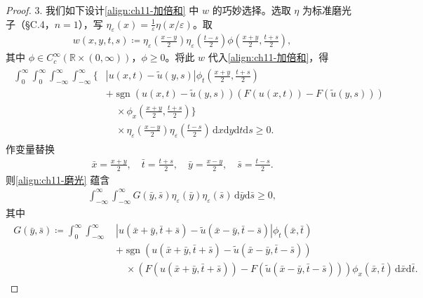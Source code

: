 \documentclass[../../main.tex]{subfiles}
\begin{document}
\begin{proof}
3. 我们如下设计\eqref{align:ch11-加倍和} 中 $w$ 的巧妙选择。选取 $\eta$ 为标准磨光子（\S C.4，$n=1$），写 $\eta_\varepsilon(x)=\frac{1}{\varepsilon}\eta(x/\varepsilon)$。取
\begin{align*}
w(x,y,t,s)\coloneqq\eta_\varepsilon\left(\frac{x-y}{2}\right)\eta_\varepsilon\left(\frac{t-s}{2}\right)\phi\left(\frac{x+y}{2},\frac{t+s}{2}\right),
\end{align*}
其中 $\phi\in C_c^\infty(\mathbb{R}\times(0,\infty))$，$\phi\geqslant 0$。将此 $w$ 代入\eqref{align:ch11-加倍和}，得
{\footnotesize\begin{align}
\begin{split}
\int_0^\infty\int_0^\infty\int_{-\infty}^\infty\int_{-\infty}^\infty \bigg\{&|u(x,t)-\widetilde{u}(y,s)|\phi_t\left(\frac{x+y}{2},\frac{t+s}{2}\right)\\
&+\operatorname{sgn}(u(x,t)-\widetilde{u}(y,s))(F(u(x,t))-F(\widetilde{u}(y,s)))\\
&\quad\times\phi_x\left(\frac{x+y}{2},\frac{t+s}{2}\right)\bigg\}\\
&\quad\times\eta_\varepsilon\left(\frac{x-y}{2}\right)\eta_\varepsilon\left(\frac{t-s}{2}\right)\,\mathrm{d}x\mathrm{d}y\mathrm{d}t\mathrm{d}s\geqslant 0.
\end{split}
\label{align:ch11-磨光}
\end{align}}
作变量替换
\begin{align*}
\bar{x}=\frac{x+y}{2},\quad \bar{t}=\frac{t+s}{2},\quad \bar{y}=\frac{x-y}{2},\quad \bar{s}=\frac{t-s}{2}.
\end{align*}
则\eqref{align:ch11-磨光} 蕴含
\begin{align*}
\int_{-\infty}^\infty\int_{-\infty}^\infty G(\bar{y},\bar{s})\eta_\varepsilon(\bar{y})\eta_\varepsilon(\bar{s})\,\mathrm{d}\bar{y}\mathrm{d}\bar{s}\geqslant 0,
\end{align*}
其中
\begin{align*}
\begin{aligned}
G(\bar{y},\bar{s})\coloneqq\int_0^\infty\int_{-\infty}^\infty \,&|u(\bar{x}+\bar{y},\bar{t}+\bar{s})-\widetilde{u}(\bar{x}-\bar{y},\bar{t}-\bar{s})|\phi_t(\bar{x},\bar{t})\\
&+\operatorname{sgn}(u(\bar{x}+\bar{y},\bar{t}+\bar{s})-\widetilde{u}(\bar{x}-\bar{y},\bar{t}-\bar{s}))\\
&\quad\times(F(u(\bar{x}+\bar{y},\bar{t}+\bar{s}))-F(\widetilde{u}(\bar{x}-\bar{y},\bar{t}-\bar{s})))\phi_x(\bar{x},\bar{t})\,\mathrm{d}\bar{x}\mathrm{d}\bar{t}.
\end{aligned}
\end{align*}

\end{proof}
\end{document}
